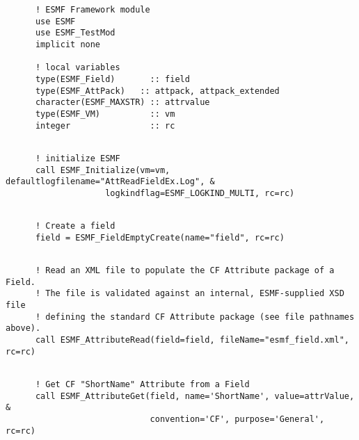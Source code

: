  \begin{verbatim}
      ! ESMF Framework module
      use ESMF
      use ESMF_TestMod
      implicit none

      ! local variables
      type(ESMF_Field)       :: field
      type(ESMF_AttPack)   :: attpack, attpack_extended
      character(ESMF_MAXSTR) :: attrvalue
      type(ESMF_VM)          :: vm
      integer                :: rc
 
\end{verbatim}
 

 \begin{verbatim}
      ! initialize ESMF
      call ESMF_Initialize(vm=vm, defaultlogfilename="AttReadFieldEx.Log", &
                    logkindflag=ESMF_LOGKIND_MULTI, rc=rc)
 
\end{verbatim}
 

 \begin{verbatim}
      ! Create a field
      field = ESMF_FieldEmptyCreate(name="field", rc=rc)
 
\end{verbatim}
 

 \begin{verbatim}
      ! Read an XML file to populate the CF Attribute package of a Field.
      ! The file is validated against an internal, ESMF-supplied XSD file
      ! defining the standard CF Attribute package (see file pathnames above).
      call ESMF_AttributeRead(field=field, fileName="esmf_field.xml", rc=rc)
 
\end{verbatim}
 

 \begin{verbatim}
      ! Get CF "ShortName" Attribute from a Field
      call ESMF_AttributeGet(field, name='ShortName', value=attrValue, &
                             convention='CF', purpose='General', rc=rc)
 
\end{verbatim}
 

